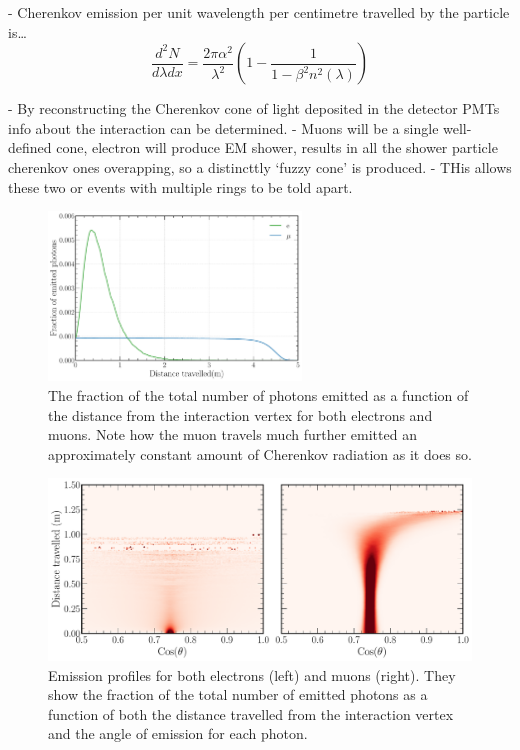 - Cherenkov emission per unit wavelength per centimetre travelled by the particle is\dots
\begin{equation}
    \frac{d^{2}N}{d\lambda dx}=\frac{2\pi\alpha^{2}}{\lambda^{2}}
    (1-\frac{1}{1-\beta^{2}n^{2}(\lambda)})
    \label{eq:cherenkov_emission}
\end{equation}

- By reconstructing the Cherenkov cone of light deposited in the detector PMTs info about the
interaction can be determined.
- Muons will be a single well-defined cone, electron will produce EM shower, results in all the
shower particle cherenkov ones overapping, so a distincttly `fuzzy cone' is produced.
- THis allows these two or events with multiple rings to be told apart.

\begin{figure} %
    \includegraphics[width=0.6\textwidth]{diagrams/4-chips/emission_distance.pdf}
    \caption[Fraction of Cherenkov photons emitted as a function of distance.]
    {The fraction of the total number of photons emitted as a function of the distance from the
        interaction vertex for both electrons and muons. Note how the muon travels much further
        emitted an approximately constant amount of Cherenkov radiation as it does so.}
    \label{fig:emission distance}
\end{figure}

\begin{figure} %
    \includegraphics[width=\textwidth]{diagrams/4-chips/emission_profile.pdf}
    \caption[Emission profiles for both electrons and muons]
    {Emission profiles for both electrons (left) and muons (right). They show the fraction of the
        total number of emitted photons as a function of both the distance travelled from the
        interaction vertex and the angle of emission for each photon.}
    \label{fig:emission_profile}
\end{figure}

